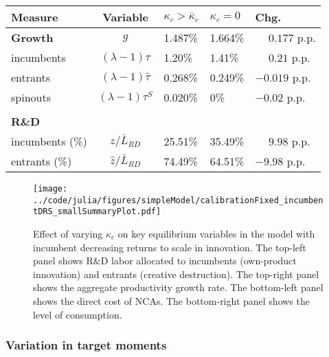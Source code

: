 \documentclass[11pt,english]{article}
\theoremstyle{definition}
\begin{document}
\begin{table}[]
	\centering
	\label{reducing_kappa_c_decomposition_table_incumbentRDS}
	\begin{tabular}{lclll}
		\toprule \toprule
		Measure & Variable & $\kappa_c > \bar{\kappa}_c$ & $\kappa_c = 0$ & Chg. \tabularnewline
		\midrule
		\textbf{Growth} & $g$ & 1.487\% & 1.664\% & $\phantom{-}0.177$ p.p.\tabularnewline
		\multicolumn{1}{l}{\quad incumbents} & $(\lambda -1) \tau$  & 1.20\% & 1.41\% & $\phantom{-}0.21$ p.p. \tabularnewline
		\multicolumn{1}{l}{\quad entrants} & $(\lambda -1) \hat{\tau}$ & 0.268\% & 0.249\% & $-0.019$ p.p. \tabularnewline
		\multicolumn{1}{l}{\quad spinouts} & $(\lambda -1) \tau^S$ & 0.020\% & 0\% & $-0.02$ p.p. \tabularnewline
		\tabularnewline
		\textbf{R\&D} & & & & 
		\tabularnewline
		\multicolumn{1}{l}{\quad incumbents (\%)}  & $z / \bar{L}_{RD}$ & 25.51\% & 35.49\% & $\phantom{-} 9.98$ p.p. \tabularnewline 
		
		\multicolumn{1}{l}{\quad entrants (\%)}  & $\hat{z} / \bar{L}_{RD}$ & 74.49\% & 64.51\% & $-9.98$ p.p. \tabularnewline
		\bottomrule
	\end{tabular}
\end{table}


\begin{figure}[]
\centering
\texttt{[image: ../code/julia/figures/simpleModel/calibrationFixed\_incumbentDRS\_smallSummaryPlot.pdf]}
\caption{Effect of varying $\kappa_c$ on key equilibrium variables in the model with incumbent decreasing returns to scale in innovation. The top-left panel shows R\&D labor allocated to incumbents (own-product innovation) and entrants (creative destruction). The top-right panel shows the aggregate productivity growth rate. The bottom-left panel shows the direct cost of NCAs. The bottom-right panel shows the level of consumption.}
\label{calibration_incumbentDRS_summaryPlot}
\end{figure}





\subsubsection{Variation in target moments}
\end{document}
